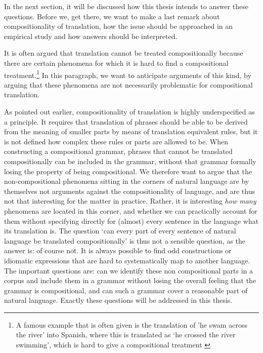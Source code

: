 In the next section, it will be discussed how this thesis intends to answer these questions. Before we, get there, we want to make a last remark about compositionality of translation, how the issue should be approached in an empirical study and how answers should be interpreted.

It is often argued that translation cannot be treated compositionally because there are certain phenomena for which it is hard to find a compositional treatment.\footnote{A famous example that is often given is the translation of 'he swam across the river' into Spanish, where this is translated as `he crossed the river swimming', which is hard to give a compositional treatment \citep{landsbergen1989power}} In this paragraph, we want to anticipate arguments of this kind, by arguing that these phenomena are not necessarily problematic for compositional translation.

As pointed out earlier, compositionality  of translation is highly underspecified as a principle. It requires that translation of phrases should be able to be derived from the meaning of smaller parts by means of translation equivalent rules, but it is not defined how complex these rules or parts are allowed to be. When constructing a compositional grammar, phrases that cannot be translated compositionally can be included in the grammar, without that grammar formally losing the property of being compositional. We therefore want to argue that the non-compositional phenomena sitting in the corners of natural language are by themselves not arguments against the compositionality of language, and are thus not that interesting for the matter in practice. Rather, it is interesting \textit{how many} phenomena are located in this corner, and whether we can practically account for them without specifying directly for (almost) every sentence in the language what its translation is. The question `can every part of every sentence of natural language be translated compositionally' is thus not a sensible question, as the answer is: of course not. It is always possible to find odd constructions or idiomatic expressions that are hard to systematically map to another language. The important questions are: can we identify these non compositional parts in a corpus and include them in a grammar without losing the overall feeling that the grammar is compositional, and can such a grammar cover a reasonable part of natural language. Exactly these questions will be addressed in this thesis.

